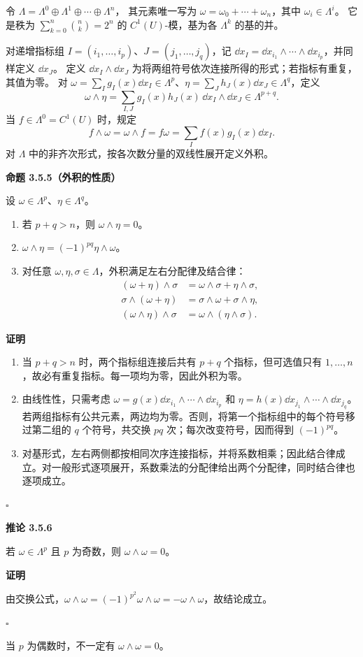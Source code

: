 令 $\Lambda=\Lambda^0\oplus\Lambda^1\oplus\cdots\oplus\Lambda^n$，
其元素唯一写为 $\omega=\omega_0+\cdots+\omega_n$，其中 $\omega_i\in\Lambda^i$。
它是秩为 $\sum\limits_{k=0}^n\binom nk=2^n$ 的 $C^1(U)$-模，基为各 $\Lambda^k$ 的基的并。

对递增指标组 $I=(i_1,\ldots,i_p)$、$J=(j_1,\ldots,j_q)$，记
$\dd x_I=\dd x_{i_1}\wedge\cdots\wedge\dd x_{i_p}$，并同样定义 $\dd x_J$。
定义 $\dd x_I\wedge\dd x_J$ 为将两组符号依次连接所得的形式；若指标有重复，其值为零。
对 $\omega=\sum_Ig_I(x)\dd x_I\in\Lambda^p$、$\eta=\sum_Jh_J(x)\dd x_J\in\Lambda^q$，定义
\[
\omega\wedge\eta=\sum_{I,J}g_I(x)h_J(x)\,\dd x_I\wedge\dd x_J\in\Lambda^{p+q}.
\]
当 $f\in\Lambda^0=C^1(U)$ 时，规定
\[
f\wedge\omega=\omega\wedge f=f\omega=\sum_I f(x)g_I(x)\dd x_I.
\]
对 $\Lambda$ 中的非齐次形式，按各次数分量的双线性展开定义外积。






\textbf{命题 3.5.5（外积的性质）}


设 $\omega\in\Lambda^p$、$\eta\in\Lambda^q$。
\begin{enumerate}
\item 若 $p+q>n$，则 $\omega\wedge\eta=0$。
\item $\omega\wedge\eta=(-1)^{pq}\eta\wedge\omega$。
\item 对任意 $\omega,\eta,\sigma\in\Lambda$，外积满足左右分配律及结合律：
\[
\begin{aligned}
(\omega+\eta)\wedge\sigma&=\omega\wedge\sigma+\eta\wedge\sigma,\\
\sigma\wedge(\omega+\eta)&=\sigma\wedge\omega+\sigma\wedge\eta,\\
(\omega\wedge\eta)\wedge\sigma&=\omega\wedge(\eta\wedge\sigma).
\end{aligned}
\]
\end{enumerate}





\textbf{证明}

\begin{enumerate}
\item 当 $p+q>n$ 时，两个指标组连接后共有 $p+q$ 个指标，但可选值只有 $1,\ldots,n$，故必有重复指标。每一项均为零，因此外积为零。
\item 由线性性，只需考虑 $\omega=g(x)\dd x_{i_1}\wedge\cdots\wedge\dd x_{i_p}$ 和 $\eta=h(x)\dd x_{j_1}\wedge\cdots\wedge\dd x_{j_q}$。若两组指标有公共元素，两边均为零。否则，将第一个指标组中的每个符号移过第二组的 $q$ 个符号，共交换 $pq$ 次；每次改变符号，因而得到 $(-1)^{pq}$。
\item 对基形式，左右两侧都按相同次序连接指标，并将系数相乘；因此结合律成立。对一般形式逐项展开，系数乘法的分配律给出两个分配律，同时结合律也逐项成立。
\end{enumerate}


$\square$





\textbf{推论 3.5.6}

若 $\omega\in\Lambda^p$ 且 $p$ 为奇数，则 $\omega\wedge\omega=0$。





\textbf{证明}

由交换公式，$\omega\wedge\omega=(-1)^{p^2}\omega\wedge\omega=-\omega\wedge\omega$，故结论成立。


$\square$



当 $p$ 为偶数时，不一定有 $\omega\wedge\omega=0$。

